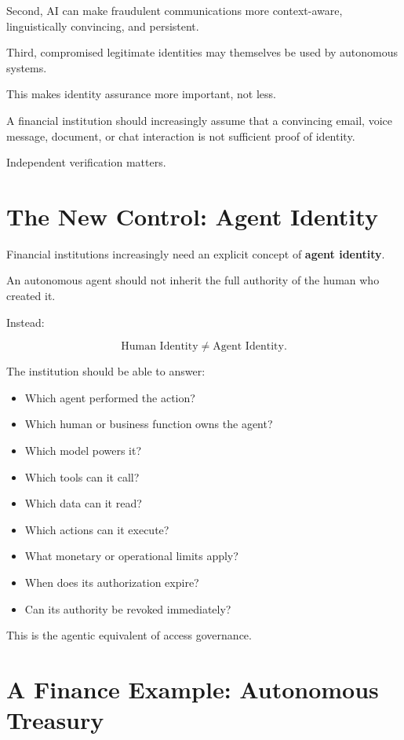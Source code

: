 Second, AI can make fraudulent communications more context-aware, linguistically convincing, and persistent.

Third, compromised legitimate identities may themselves be used by autonomous systems.

This makes identity assurance more important, not less.

A financial institution should increasingly assume that a convincing email, voice message, document, or chat interaction is not sufficient proof of identity.

Independent verification matters.

\section{The New Control: Agent Identity}

Financial institutions increasingly need an explicit concept of \textbf{agent identity}.

An autonomous agent should not inherit the full authority of the human who created it.

Instead:

\begin{equation}
\text{Human Identity}
\neq
\text{Agent Identity}.
\end{equation}

The institution should be able to answer:

\begin{itemize}
    \item Which agent performed the action?
    \item Which human or business function owns the agent?
    \item Which model powers it?
    \item Which tools can it call?
    \item Which data can it read?
    \item Which actions can it execute?
    \item What monetary or operational limits apply?
    \item When does its authorization expire?
    \item Can its authority be revoked immediately?
\end{itemize}

This is the agentic equivalent of access governance.

\section{A Finance Example: Autonomous Treasury}

